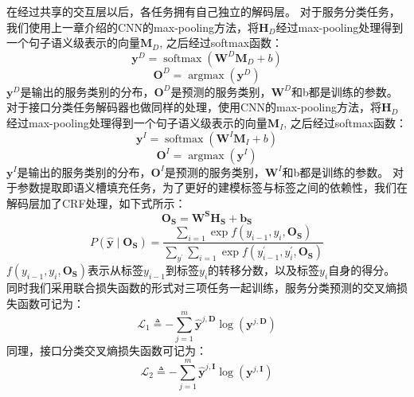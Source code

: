 在经过共享的交互层以后，各任务拥有自己独立的解码层。
对于服务分类任务，我们使用上一章介绍的CNN的max-pooling方法，将$\mathbf{H}_{D}$经过max-pooling处理得到一个句子语义级表示的向量$\mathbf{M}_D$,
之后经过softmax函数：
\begin{equation}
  \mathbf{y}^{D}=\operatorname{softmax} (\mathbf{W}^{D}\mathbf{M}_D+b)
\end{equation}
\begin{equation}
  \mathbf{O}^{D}=\operatorname{argmax} (\mathbf{y}^{D})
\end{equation}
$\mathbf{y}^{D}$是输出的服务类别的分布，$\mathbf{O}^{D}$是预测的服务类别，$\mathbf{W}^{D}$和b都是训练的参数。
对于接口分类任务解码器也做同样的处理，使用CNN的max-pooling方法，将$\mathbf{H}_{D}$经过max-pooling处理得到一个句子语义级表示的向量$\mathbf{M}_I$,
之后经过softmax函数：
\begin{equation}
  \mathbf{y}^{I}=\operatorname{softmax} (\mathbf{W}^{I}\mathbf{M}_I+b)
\end{equation}
\begin{equation}
  \mathbf{O}^{I}=\operatorname{argmax} (\mathbf{y}^{I})
\end{equation}
$\mathbf{y}^{I}$是输出的服务类别的分布，$\mathbf{O}^{I}$是预测的服务类别，$\mathbf{W}^{I}$和b都是训练的参数。
对于参数提取即语义槽填充任务，为了更好的建模标签与标签之间的依赖性，我们在解码层加了CRF处理，如下式所示：
\begin{equation}
  \mathbf{O}_{\mathbf{S}} =\mathbf{W}^{\mathbf{S}} {\mathbf{H}}_{\mathbf{S}}+\mathbf{b}_{\mathbf{S}} 
\end{equation}
\begin{equation}
  P\left(\hat{\mathbf{y}} \mid \mathbf{O}_{\mathbf{S}}\right) =\frac{\sum_{i=1} \exp f\left(y_{i-1}, y_{i}, \mathbf{O}_{\mathbf{S}}\right)}{\sum_{y^{\prime}} \sum_{i=1} \exp f\left(y_{i-1}^{\prime}, y_{i}^{\prime}, \mathbf{O}_{\mathbf{S}}\right)}
  \end{equation}
  $f(y_{i-1}, y_{i}, \mathbf{O}_{\mathbf{S}})$表示从标签$y_{i-1}$到标签$y_{i}$的转移分数，以及标签$y_{i}$自身的得分。
同时我们采用联合损失函数的形式对三项任务一起训练，服务分类预测的交叉熵损失函数可记为：
\begin{equation}
\mathcal{L}_{1} \triangleq-\sum_{j=1}^{m} \hat{\mathbf{y}}^{j, \mathbf{D}} \log \left(\mathbf{y}^{j, \mathbf{D}}\right)
\end{equation}
同理，接口分类交叉熵损失函数可记为：
\begin{equation}
  \mathcal{L}_{2} \triangleq-\sum_{j=1}^{m} \hat{\mathbf{y}}^{j, \mathbf{I}} \log \left(\mathbf{y}^{j, \mathbf{I}}\right)
  \end{equation}
